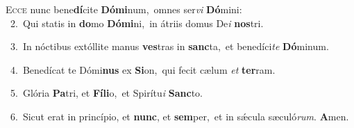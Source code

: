 \lettrine{\initial\textcolor{\initialcolor}{E}}{cce} nunc bene\-\textbf{dí}\-cite \textbf{Dó}\-\textbf{mi}num,~\star omnes ser\textit{vi} \textbf{Dó}\-mini:\\
{\numbfont\textcolor{\numbcolor}{~2.}}~Qui statis in \textbf{do}\-mo \textbf{Dó}\-\textbf{mi}ni,~\star in átriis domus De\textit{i} \textbf{nos}\-tri.\par
{\numbfont\textcolor{\numbcolor}{~3.}}~In nóctibus extóllite manus \textbf{ves}\-tras in \textbf{sanc}\-ta,~\star et benedíci\textit{te} \textbf{Dó}\-minum.\par
{\numbfont\textcolor{\numbcolor}{~4.}}~Benedícat te Dómi\textbf{nus} ex \textbf{Si}\-on,~\star qui fecit cælum \textit{et} \textbf{ter}\-ram.\par
{\numbfont\textcolor{\numbcolor}{~5.}}~Glória \textbf{Pa}\-tri, et \textbf{Fí}\-\textbf{li}o,~\star et Spirítu\textit{i} \textbf{Sanc}\-to.\par
{\numbfont\textcolor{\numbcolor}{~6.}}~Sicut erat in princípio, et \textbf{nunc}\-, et \textbf{sem}\-per,~\star et in sǽcula sæculó\-\textit{rum}\-. \textbf{A}\-men.\par
